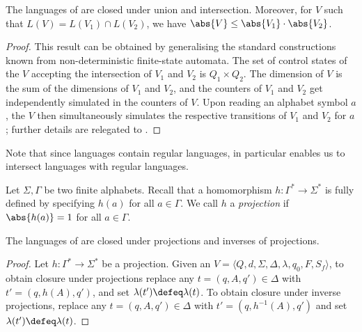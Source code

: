 \begin{proposition}\label{prop:union-intersetion-closure}
  The languages of \laVASS are closed under union and intersection.
  Moreover, for $V$ such that $L(V) = L(V_1) \cap L(V_2)$, we have
  $\abs{V} \le \abs{V_1} \cdot \abs{V_2}$.
\end{proposition}
\begin{proof}
  This result can be obtained by generalising the standard
  constructions known from non-deterministic finite-state automata.
  The set of control states of the \laVASS $V$ accepting the
  intersection of \laVASS $V_1$ and $V_2$ is $Q_1\times Q_2$. The
  dimension of $V$ is the sum of the dimensions of $V_1$ and $V_2$,
  and the counters of $V_1$ and $V_2$ get independently simulated in
  the counters of $V$. Upon reading an alphabet symbol $a$, the
  \laVASS $V$ then simultaneously simulates the respective transitions
  of $V_1$ and $V_2$ for $a$; further details are relegated to
  .
\end{proof}

Note that since \laVASS languages contain regular languages,
 in particular enables us to
intersect \laVASS languages with regular languages.

Let $\Sigma,\Gamma$ be two finite alphabets. Recall that a
homomorphism $h\colon \Gamma^* \to \Sigma^*$ is fully defined by
specifying $h(a)$ for all $a\in \Gamma$. We call $h$ a
\emph{projection} if $\abs{h(a)}=1$ for all $a\in \Gamma$.
%
\begin{proposition}\label{prop:projection-closure}
  The languages of \laVASS are closed under projections and inverses
  of projections.
\end{proposition}
\begin{proof}
  Let $h\colon \Gamma^* \to \Sigma^*$ be a projection. Given an
  \laVASS $V=\langle Q,d, \Sigma,\Delta,\lambda,q_0,F,S_f\rangle$, to
  obtain closure under projections replace any $t=(q,A,q')\in \Delta$
  with $t'=(q,h(A),q')$, and set $\lambda(t')\defeq \lambda(t)$. To
  obtain closure under inverse projections, replace any $t=(q,A,q')\in
  \Delta$ with $t'=(q,h^{-1}(A),q')$ and set $\lambda(t')\defeq
  \lambda(t)$.
\end{proof}
